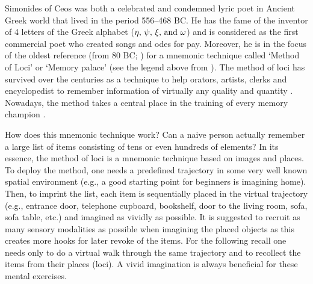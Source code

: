   Simonides of Ceos was both a celebrated and condemned lyric poet in Ancient
  Greek world that lived in the period 556--468 BC. He has the fame of the
  inventor of 4 letters of the Greek alphabet ($\eta, \, \psi, \, \xi,\,{\rm
  and } \,\, \omega$) and is considered as the first commercial poet who
  created songs and odes for pay. Moreover, he is in the focus of the oldest
  reference (from 80 BC; \citep{Rhetorica}) for a mnemonic technique called
  `Method of Loci' or `Memory palace' (see the legend above from
  \cite{Cicero}). The method of loci has survived over the centuries as a
  technique to help orators, artists, clerks and encyclopedist to remember
  information of virtually any quality and quantity \citep{Yates66}. Nowadays,
  the method takes a central place in the training of every memory champion
  \citep{Foer2011}.
  
  How does this mnemonic technique work? Can a naive person actually remember a
  large list of items consisting of tens or even hundreds of elements? In its
  essence, the method of loci is a mnemonic technique based on images and
  places. To deploy the method, one needs a predefined trajectory in some very
  well known spatial environment (e.g., a good starting point for beginners is
  imagining home). Then, to imprint the list, each item is sequentially placed
  in the virtual trajectory (e.g., entrance door, telephone cupboard,
  bookshelf, door to the living room, sofa, sofa table, etc.) and imagined as
  vividly as possible. It is suggested to recruit as many sensory modalities as
  possible when imagining the placed objects as this creates more hooks for
  later revoke of the items. For the following recall one needs only to do a
  virtual walk through the same trajectory and to recollect the items from
  their places (loci). A vivid imagination is always beneficial for these
  mental exercises.


